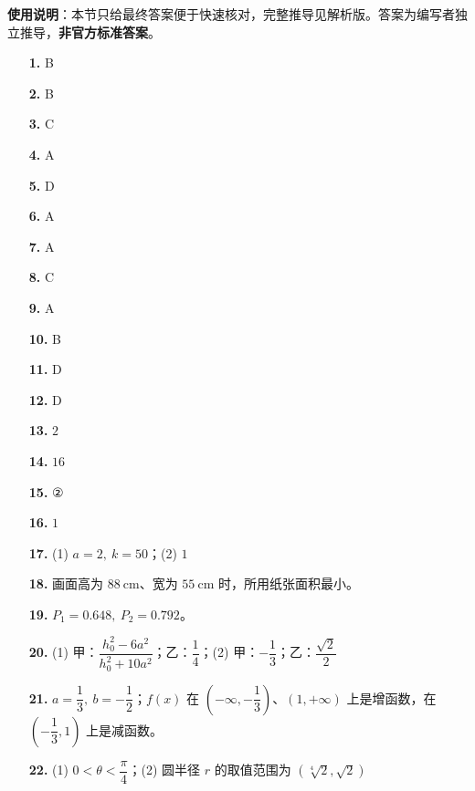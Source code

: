 
\begin{gknotice}
\textbf{使用说明}：本节只给最终答案便于快速核对，完整推导见解析版。答案为编写者独立推导，\textbf{非官方标准答案}。
\end{gknotice}

\begin{itemize}[leftmargin=2.6em]
  \item[\textbf{1.}] B
  \item[\textbf{2.}] B
  \item[\textbf{3.}] C
  \item[\textbf{4.}] A
  \item[\textbf{5.}] D
  \item[\textbf{6.}] A
  \item[\textbf{7.}] A
  \item[\textbf{8.}] C
  \item[\textbf{9.}] A
  \item[\textbf{10.}] B
  \item[\textbf{11.}] D
  \item[\textbf{12.}] D
  \item[\textbf{13.}] $2$
  \item[\textbf{14.}] $16$
  \item[\textbf{15.}] ②
  \item[\textbf{16.}] $1$
  \item[\textbf{17.}] (1) $a=2,\ k=50$；(2) $1$
  \item[\textbf{18.}] 画面高为 $88\ \mathrm{cm}$、宽为 $55\ \mathrm{cm}$ 时，所用纸张面积最小。
  \item[\textbf{19.}] $P_1=0.648,\ P_2=0.792$。
  \item[\textbf{20.}] (1) 甲：$\dfrac{h_0^2-6a^2}{h_0^2+10a^2}$；乙：$\dfrac14$；(2) 甲：$-\dfrac13$；乙：$\dfrac{\sqrt2}{2}$
  \item[\textbf{21.}] $a=\dfrac13,\ b=-\dfrac12$；$f(x)$ 在 $\left(-\infty,-\dfrac13\right)$、$(1,+\infty)$ 上是增函数，在 $\left(-\dfrac13,1\right)$ 上是减函数。
  \item[\textbf{22.}] (1) $0<\theta<\dfrac\pi4$；(2) 圆半径 $r$ 的取值范围为 $\left(\sqrt[4]{2},\sqrt2\right)$
\end{itemize}
